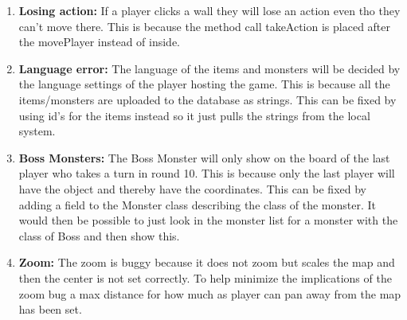 \begin{enumerate}
	\item \textbf{Losing action:} If a player clicks a wall they will lose an action even tho they can't move there. This is because the method call takeAction is placed after the movePlayer instead of inside.
	
	\item \textbf{Language error:} The language of the items and monsters will be decided by the language settings of the player hosting the game. This is because all the items/monsters are uploaded to the database as strings. This can be fixed by using id's for the items instead so it just pulls the strings from the local system.
	
	\item \textbf{Boss Monsters:} The Boss Monster will only show on the board of the last player who takes a turn in round 10. This is because only the last player will have the object and thereby have the coordinates. This can be fixed by adding a field to the Monster class describing the class of the monster. It would then be possible to just look in the monster list for a monster with the class of Boss and then show this.%
	
	\item \textbf{Zoom:} The zoom is buggy because it does not zoom but scales the map and then the center is not set correctly. To help minimize the implications of the zoom bug a max distance for how much as player can pan away from the map has been set.
	
\end{enumerate}